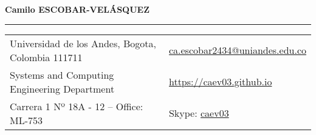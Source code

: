 \documentclass[letterpaper,11pt,oneside]{article}
\newcommand*{\Skype}{\href{skype:caev03?add}{caev03}}
\newcommand{\Absender}[1][\normalsize]{\Skype}
\begin{document}

\noindent \LARGE{\textbf{Camilo ESCOBAR-VEL\'{A}SQUEZ}} \\
\vspace{-2ex}
\hrule 
\normalsize


\begin{center}
\begin{tabular}{ll}
 Universidad de los Andes, Bogota, Colombia 111711   & \hspace{0.5in} \href{mailto:ca.escobar2434@uniandes.edu.co}{ca.escobar2434@uniandes.edu.co} \\
 Systems and Computing Engineering Department    & \hspace{0.5in}  \href{https://caev03.github.io}{https://caev03.github.io}   \\
 Carrera 1 Nº 18A - 12 --	Office: ML-753           & \hspace{0.5in} Skype: \Absender  \\
\end{tabular}
\end{center}

\vspace{1em}

\end{document}
